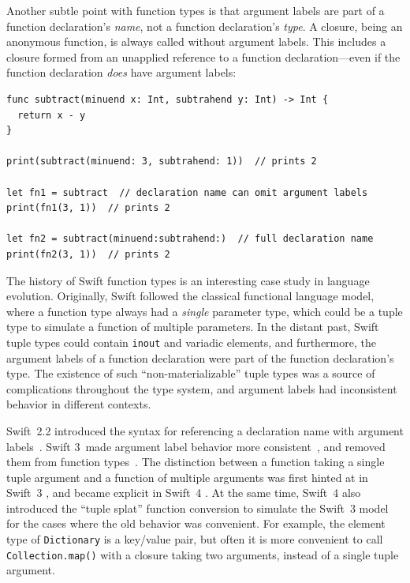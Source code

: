 \documentclass[../generics]{subfiles}
\begin{document}
Another subtle point with function types is that argument labels are part of a function declaration's \emph{name}, not a function declaration's \emph{type}. A closure, being an anonymous function, is always called without argument labels. This includes a closure formed from an unapplied reference to a function declaration---even if the function declaration \emph{does} have argument labels:
\begin{Verbatim}
func subtract(minuend x: Int, subtrahend y: Int) -> Int {
  return x - y
}

print(subtract(minuend: 3, subtrahend: 1))  // prints 2

let fn1 = subtract  // declaration name can omit argument labels
print(fn1(3, 1))  // prints 2

let fn2 = subtract(minuend:subtrahend:)  // full declaration name
print(fn2(3, 1))  // prints 2
\end{Verbatim}

The history of Swift function types is an interesting case study in language evolution. Originally, Swift followed the classical functional language model, where a function type always had a \emph{single} parameter type, which could be a tuple type to simulate a function of multiple parameters. In the distant past, Swift tuple types could contain \texttt{inout} and variadic elements, and furthermore, the argument labels of a function declaration were part of the function declaration's type. The existence of such ``non-materializable'' tuple types was a source of complications throughout the type system, and argument labels had inconsistent behavior in different contexts.

Swift~2.2 introduced the syntax for referencing a declaration name with argument labels~\cite{se0021}. Swift 3~made argument label behavior more consistent~\cite{se0046}, and removed them from function types~\cite{se0111}. The distinction between a function taking a single tuple argument and a function of multiple arguments was first hinted at in Swift~3 \cite{se0029,se0066}, and became explicit in Swift~4 \cite{se0110}. At the same time, Swift~4 also introduced the ``tuple splat'' function conversion to simulate the Swift~3 model for the cases where the old behavior was convenient. For example, the element type of \texttt{Dictionary} is a key/value pair, but often it is more convenient to call \texttt{Collection.map()} with a closure taking two arguments, instead of a single tuple argument.
\end{document}
